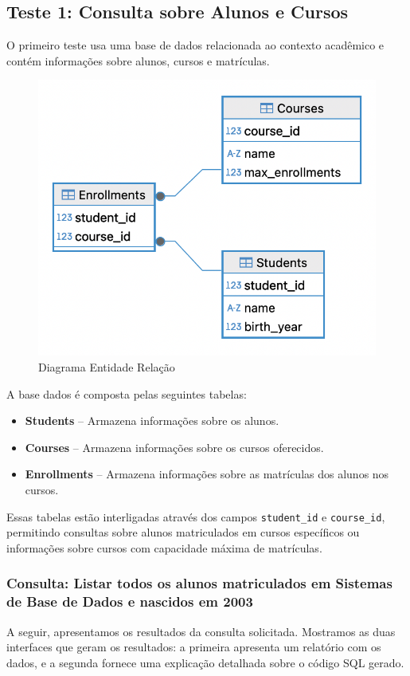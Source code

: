 \documentclass{article}
\begin{document}
\subsection{Teste 1: Consulta sobre Alunos e Cursos}

O primeiro teste usa uma base de dados relacionada ao contexto acadêmico e contém informações sobre alunos, cursos e matrículas.

\begin{figure}[!ht]
    \centering
    \includegraphics[width=0.5\linewidth]{images/schema1.png}
    \caption{Diagrama Entidade Relação}
    \label{fig:enter-label}
\end{figure}

A base dados é composta pelas seguintes tabelas:
\begin{itemize} 
    \item \textbf{Students} – Armazena informações sobre os alunos. 
    \item \textbf{Courses} – Armazena informações sobre os cursos oferecidos. 
    \item \textbf{Enrollments} – Armazena informações sobre as matrículas dos alunos nos cursos. 
\end{itemize}

Essas tabelas estão interligadas através dos campos \texttt{student\_id} e \texttt{course\_id}, permitindo consultas sobre alunos matriculados em cursos específicos ou informações sobre cursos com capacidade máxima de matrículas.

\subsubsection{Consulta: Listar todos os alunos matriculados em Sistemas de Base de Dados e nascidos em 2003}

A seguir, apresentamos os resultados da consulta solicitada. Mostramos as duas interfaces que geram os resultados: a primeira apresenta um relatório com os dados, e a segunda fornece uma explicação detalhada sobre o código SQL gerado.
\end{document}
